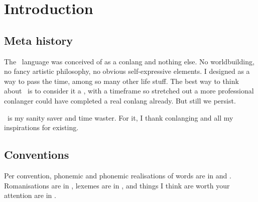 \chapter{Introduction}
\section{Meta history}
The \langname~language was conceived of as a conlang and nothing else. No worldbuilding,
no fancy artistic philosophy, no obvious self-expressive elements. I designed \langname{}
as a way to pass the time, among so many other life stuff. The best way to think about
\langname~is to consider it a , with a timeframe so stretched out a more professional
conlanger could have completed a real conlang already. But still we persist.

\langname~is my sanity saver and time waster. For it, I thank conlanging and all my
inspirations for existing.

\section{Conventions}
Per convention, phonemic and phonemic realisations of words are in 
and . Romanisations are in , lexemes are in
, and things I think are worth your attention are in .